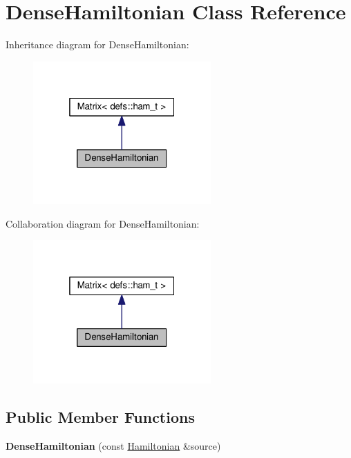 \hypertarget{classDenseHamiltonian}{}\section{Dense\+Hamiltonian Class Reference}
\label{classDenseHamiltonian}


Inheritance diagram for Dense\+Hamiltonian\+:\nopagebreak
\begin{figure}[H]
\begin{center}
\leavevmode
\includegraphics[width=193pt]{classDenseHamiltonian__inherit__graph}
\end{center}
\end{figure}


Collaboration diagram for Dense\+Hamiltonian\+:\nopagebreak
\begin{figure}[H]
\begin{center}
\leavevmode
\includegraphics[width=193pt]{classDenseHamiltonian__coll__graph}
\end{center}
\end{figure}
\subsection*{Public Member Functions}
\begin{DoxyCompactItemize}
\item 
{\bfseries Dense\+Hamiltonian} (const \hyperlink{classHamiltonian}{Hamiltonian} \&source)\hypertarget{classDenseHamiltonian_ad171bef2d0b359ea8f93a56b1932272d}{}\label{classDenseHamiltonian_ad171bef2d0b359ea8f93a56b1932272d}

\end{DoxyCompactItemize}

